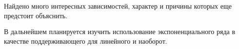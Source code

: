\documentclass[specialist, substylefile = spbureport.rtx,
    subf,href,colorlinks=true, 12pt]{disser}
\begin{document}
        

        


    \conclusion
        Найдено много интересных зависимостей, характер и причины которых еще предстоит объяснить.

        В дальнейшем планируется изучить использование экспоненциального ряда в качестве поддерживающего для линейного и наоборот.
 

        

    

	\renewcommand{\refname}{}
	\vspace{-25pt}
	
	
\end{document}
